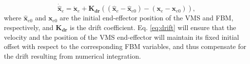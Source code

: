 \documentclass[../main.tex]{subfiles}
\begin{document}
\begin{equation}
    \label{eq:drift}
    \dot{\hat{\bm{x}}}_e =  \dot{{\bm{x}}}_e + \bm{K_{dr}} \left(
\left( \hat{\bm{x}}_e - \hat{\bm{x}}_{e0} \right) - \left( {\bm{x}}_e - {\bm{x}}_{e0} \right) \right),
\end{equation} 
where $\hat{\bm{x}}_{e0}$ and ${\bm{x}}_{e0}$ are the initial end-effector position of the VMS and FBM, respectively, and $\bm{K_{dr}}$ is the drift coefficient. Eq. \eqref{eq:drift} will ensure that the velocity and the position of the VMS end-effector will maintain its fixed initial offset with respect to the corresponding FBM variables, and thus compensate for the drift resulting from  numerical integration.
\end{document}
